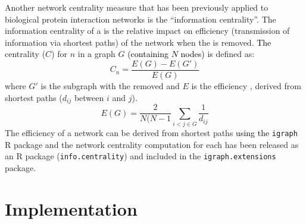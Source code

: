 Another network \gls{centrality} measure that has been previously applied to biological protein interaction networks \citep{Kranthi2013} is the ``\gls{information centrality}''. The \gls{information centrality} of a  is the relative impact on efficiency (transmission of information via \glspl{shortest path}) of the network when the  is removed. \textcolor{black}{The} \gls{centrality} ($C$) \citep{Kranthi2013} for  $n$ in \textcolor{black}{a} graph $G$ \textcolor{black}{(containing $N$ nodes)} is defined as: $$C_n = \frac{E(G)-E(G')}{E(G)}$$ where $G'$ is the subgraph with the  removed and $E$ is the efficiency \citep{Latora2001}, derived from \glspl{shortest path} ($d_{ij}$ between  $i$ and $j$). $$E(G) = \frac{2}{N(N-1} \sum_{i<j \in G}^{} \frac{1}{d_{ij}}$$ The efficiency of a network can be derived from \glspl{shortest path} \textcolor{black}{using the} \texttt{igraph} R package and the network \gls{centrality} computation for each  has been released as an R package (\texttt{info.centrality}) and included in the \texttt{igraph.extensions} package.


\section{Implementation}



